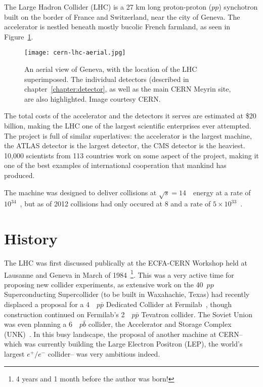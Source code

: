 \label{chapter:lhc}

The Large Hadron Collider (LHC) is a 27 km long proton-proton ($pp$) synchotron built on the border of France and Switzerland, near the city of Geneva. The accelerator is nestled beneath mostly bucolic French farmland, as seen in Figure~\ref{fig:lhc:cern-lhc-aerial}.


\begin{figure}
\centering
\texttt{[image: cern-lhc-aerial.jpg]}
\label{fig:lhc:cern-lhc-aerial}
\caption{An aerial view of Geneva, with the location of the LHC superimposed. The individual detectors (described in chapter~\ref{chapter:detector}, as well as the main CERN Meyrin site, are also highlighted. Image courtesy CERN.}
\end{figure}


The total costs of the accelerator and the detectors it serves are estimated at \$20 billion, making the LHC one of the largest scientific enterprises ever attempted.  The project is full of similar superlatives: the accelerator is the largest machine, the ATLAS detector is the largest detector, the CMS detector is the heaviest. 10,000 scientists from 113 countries work on some aspect of the project, making it one of the best examples of international cooperation that mankind has produced.



The machine was designed to deliver collisions at $\sqrt{s} = 14$~\TeV~energy at a rate of $10^{34}$~\lumirate, but as of 2012 collisions had only occured at 8 \TeV and a rate of $5\times10^{33}$~\lumirate. 




\section{History}
\label{lhc:history}

The LHC was first discussed publically at the ECFA-CERN Workshop held at Lausanne and Geneva in March of 1984~\cite{ECFA1984}\footnote{4 years and 1 month before the author was born!}. This was a very active time for proposing new collider experiments, as extensive work on the 40~\TeV $pp$ Superconducting Supercollider (to be built in Waxahachie, Texas) had recently displaced a proposal for a 4~\TeV~$p\bar{p}$ Dedicated Collider at Fermilab~\cite{ECFA1984,DC}, though construction continued on Fermilab's 2~\TeV~$p\bar{p}$ Tevatron collider. The Soviet Union was even planning a 6~\TeV~$p\bar{b}$ collider, the Accelerator and Storage Complex (UNK)~\cite{UNK}. In this busy landscape, the proposal of another machine at CERN-- which was currently building the Large Electron Positron (LEP), the world's largest $e^+/e^-$ collider-- was very ambitious indeed.

